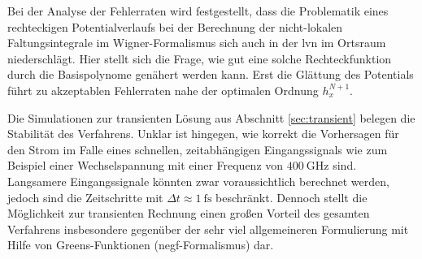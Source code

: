Bei der Analyse der Fehlerraten wird festgestellt, dass die Problematik eines rechteckigen Potentialverlaufs bei der Berechnung der nicht-lokalen Faltungsintegrale im Wigner-Formalismus sich auch in der \ac{lvn} im Ortsraum niederschlägt. Hier stellt sich die Frage, wie gut eine solche Rechteckfunktion durch die Basispolynome genähert werden kann. Erst die Glättung des Potentials führt zu akzeptablen Fehlerraten nahe der optimalen Ordnung $h_x^{N+1}$.

Die Simulationen zur transienten Lösung aus Abschnitt \ref{sec:transient} belegen die Stabilität des Verfahrens. Unklar ist hingegen, wie korrekt die Vorhersagen für den Strom im Falle eines schnellen, zeitabhängigen Eingangssignals wie zum Beispiel einer Wechselspannung mit einer Frequenz von $\SI{400}{\giga\hertz}$ sind. Langsamere Eingangssignale könnten zwar voraussichtlich berechnet werden, jedoch sind die Zeitschritte mit $\Delta t\approx\SI{1}{\femto\second}$ beschränkt. Dennoch stellt die Möglichkeit zur transienten Rechnung einen großen Vorteil des gesamten Verfahrens insbesondere gegenüber der sehr viel allgemeineren Formulierung mit Hilfe von Greens-Funktionen (\ac{negf}-Formalismus) dar.
